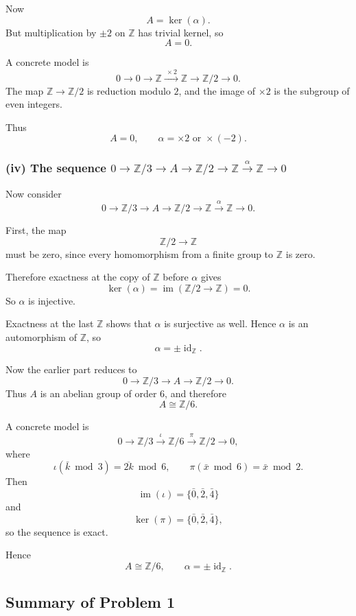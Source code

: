 \documentclass[12pt,a4paper]{article}
\theoremstyle{notespace}
\begin{document}
Now
\[
A=\ker(\alpha).
\]
But multiplication by \(\pm 2\) on \(\mathbb Z\) has trivial kernel, so
\[
A=0.
\]

A concrete model is
\[
0\longrightarrow 0
\longrightarrow \mathbb Z
\xrightarrow{\ \times 2\ }
\mathbb Z
\longrightarrow \mathbb Z/2
\longrightarrow 0.
\]
The map \(\mathbb Z\to \mathbb Z/2\) is reduction modulo \(2\), and the image of \(\times 2\) is the subgroup of even integers.

Thus
\[
\boxed{A=0,\qquad \alpha=\times 2 \text{ or } \times (-2).}
\]

\subsubsection*{(iv) The sequence \(0\to \mathbb Z/3\to A\to \mathbb Z/2\to \mathbb Z\xrightarrow{\alpha}\mathbb Z\to 0\)}

Now consider
\[
0\longrightarrow \mathbb Z/3 \longrightarrow A \longrightarrow \mathbb Z/2
\longrightarrow \mathbb Z \xrightarrow{\alpha} \mathbb Z \longrightarrow 0.
\]

First, the map
\[
\mathbb Z/2\to \mathbb Z
\]
must be zero, since every homomorphism from a finite group to \(\mathbb Z\) is zero.

Therefore exactness at the copy of \(\mathbb Z\) before \(\alpha\) gives
\[
\ker(\alpha)=\operatorname{im}(\mathbb Z/2\to \mathbb Z)=0.
\]
So \(\alpha\) is injective.

Exactness at the last \(\mathbb Z\) shows that \(\alpha\) is surjective as well. Hence \(\alpha\) is an automorphism of \(\mathbb Z\), so
\[
\alpha=\pm \operatorname{id}_{\mathbb Z}.
\]

Now the earlier part reduces to
\[
0\longrightarrow \mathbb Z/3 \longrightarrow A \longrightarrow \mathbb Z/2 \longrightarrow 0.
\]
Thus \(A\) is an abelian group of order \(6\), and therefore
\[
A\cong \mathbb Z/6.
\]

A concrete model is
\[
0\longrightarrow \mathbb Z/3
\xrightarrow{\ \iota\ }
\mathbb Z/6
\xrightarrow{\ \pi\ }
\mathbb Z/2
\longrightarrow 0,
\]
where
\[
\iota(\bar k \bmod 3)=\overline{2k}\bmod 6,
\qquad
\pi(\bar x \bmod 6)=\bar x \bmod 2.
\]
Then
\[
\operatorname{im}(\iota)=\{\bar 0,\bar 2,\bar 4\}
\]
and
\[
\ker(\pi)=\{\bar 0,\bar 2,\bar 4\},
\]
so the sequence is exact.

Hence
\[
\boxed{A\cong \mathbb Z/6,\qquad \alpha=\pm \operatorname{id}_{\mathbb Z}.}
\]

\subsection{Summary of Problem 1}
\end{document}
